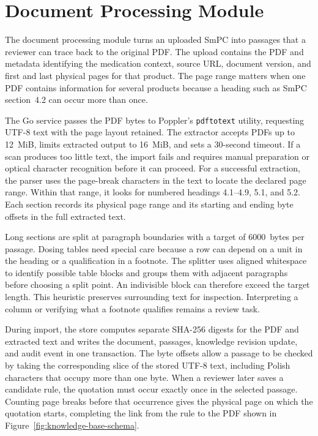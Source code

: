 \documentclass[12pt,a4paper,twoside]{book}
\begin{document}
\section{Document Processing Module}
\label{sec:document-processing}

The document processing module turns an uploaded SmPC into passages that a reviewer can trace back to the original PDF.
The upload contains the PDF and metadata identifying the medication context, source URL, document version, and first and last physical pages for that product.
The page range matters when one PDF contains information for several products because a heading such as SmPC section~4.2 can occur more than once.

The Go service passes the PDF bytes to Poppler's \texttt{pdftotext} utility, requesting UTF-8 text with the page layout retained.
The extractor accepts PDFs up to 12~MiB, limits extracted output to 16~MiB, and sets a 30-second timeout.
If a scan produces too little text, the import fails and requires manual preparation or optical character recognition before it can proceed.
For a successful extraction, the parser uses the page-break characters in the text to locate the declared page range.
Within that range, it looks for numbered headings 4.1--4.9, 5.1, and 5.2.
Each section records its physical page range and its starting and ending byte offsets in the full extracted text.

Long sections are split at paragraph boundaries with a target of 6000~bytes per passage.
Dosing tables need special care because a row can depend on a unit in the heading or a qualification in a footnote.
The splitter uses aligned whitespace to identify possible table blocks and groups them with adjacent paragraphs before choosing a split point.
An indivisible block can therefore exceed the target length.
This heuristic preserves surrounding text for inspection. Interpreting a column or verifying what a footnote qualifies remains a review task.

During import, the store computes separate SHA-256 digests for the PDF and extracted text and writes the document, passages, knowledge revision update, and audit event in one transaction.
The byte offsets allow a passage to be checked by taking the corresponding slice of the stored UTF-8 text, including Polish characters that occupy more than one byte.
When a reviewer later saves a candidate rule, the quotation must occur exactly once in the selected passage.
Counting page breaks before that occurrence gives the physical page on which the quotation starts, completing the link from the rule to the PDF shown in Figure~\ref{fig:knowledge-base-schema}.
\end{document}
